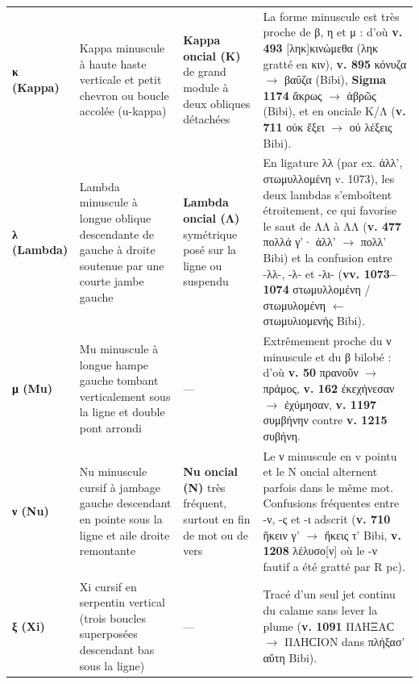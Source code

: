 \documentclass[11pt, a4paper, twoside]{article}
\renewcommand{\_}{\origunderscore\penalty0\relax}
\renewcommand{\texttt}[1]{#1}
\newcommand{\Rpc}{\textbf{R}\textsuperscript{pc}}
\newcommand{\Bibi}{\textit{Bibi}}
\newcommand{\SigmaSchol}{\textgreek{Σ}}
\newcommand{\inRas}[2]{[\kern-0.15em[#1]\kern-0.15em]#2}
\def\Rpc{R pc}%
\def\Bibi{Bibi}%
\def\SigmaSchol{Sigma}%
\def\inRas#1#2{[#1]#2}%
\begin{document}
{\begin{longtable}{@{}>{\raggedright\arraybackslash}p{} >{\raggedright\arraybackslash}p{} >{\raggedright\arraybackslash}p{} >{\raggedright\arraybackslash}p{}@{}}
\addlinespace[3pt]
\textbf{κ (Kappa)} & Kappa minuscule à haute haste verticale et petit chevron ou boucle accolée (\texttt{u}-kappa) & \textbf{Kappa oncial (\texttt{Κ})} de grand module à deux obliques détachées & La forme minuscule est très proche de β, η et μ : d'où \textbf{v. 493} \texttt{\inRas{ληκ}{κιν}ώμεθα} (\texttt{ληκ} gratté en \texttt{κιν}), \textbf{v. 895} \texttt{κόνυζα} $\to$ \texttt{βαΰζα} (\Bibi{}), \textbf{\SigmaSchol{} 1174} \texttt{ἄκρως} $\to$ \texttt{ἁβρῶς} (\Bibi{}), et en onciale \texttt{Κ/Λ} (\textbf{v. 711} \texttt{οὐκ ἔξει} $\to$ \texttt{οὐ λέξεις} \Bibi{}). \\
\addlinespace[3pt]
\textbf{λ (Lambda)} & Lambda minuscule à longue oblique descendante de gauche à droite soutenue par une courte jambe gauche & \textbf{Lambda oncial (\texttt{Λ})} symétrique posé sur la ligne ou suspendu & En ligature λλ (par ex. \texttt{ἀλλ'}, \texttt{στωμυλλομένη} v. 1073), les deux lambdas s'emboîtent étroitement, ce qui favorise le saut de \texttt{ΛΛ} à \texttt{ΛΛ} (\textbf{v. 477} \texttt{πολλά γ'· ἀλλ'} $\to$ \texttt{πολλ'} \Bibi{}) et la confusion entre -λλ-, -λ- et -λι- (\textbf{vv. 1073–1074} \texttt{στωμυλλομένη} / \texttt{στωμυλομένη} $\leftarrow$ \texttt{στωμυλιομενής} \Bibi{}). \\
\addlinespace[3pt]
\textbf{μ (Mu)} & Mu minuscule à longue hampe gauche tombant verticalement sous la ligne et double pont arrondi & — & Extrêmement proche du ν minuscule et du β bilobé : d'où \textbf{v. 50} \texttt{πρανοῦν} $\to$ \texttt{πράμος}, \textbf{v. 162} \texttt{ἐκεχήνεσαν} $\to$ \texttt{ἐχύμησαν}, \textbf{v. 1197} \texttt{συμβήνην} contre \textbf{v. 1215} \texttt{συβήνη}. \\
\addlinespace[3pt]
\textbf{ν (Nu)} & Nu minuscule cursif à jambage gauche descendant en pointe sous la ligne et aile droite remontante & \textbf{Nu oncial (\texttt{Ν})} très fréquent, surtout en fin de mot ou de vers & Le ν minuscule en \texttt{v} pointu et le \texttt{Ν} oncial alternent parfois dans le même mot. Confusions fréquentes entre -ν, -ς et -ι adscrit (\textbf{v. 710} \texttt{ἥκειν γ'} $\to$ \texttt{ἥκεις τ'} \Bibi{}, \textbf{v. 1208} \texttt{λέλυσο\inRas{ν}{}} où le -ν fautif a été gratté par \Rpc{}). \\
\addlinespace[3pt]
\textbf{ξ (Xi)} & Xi cursif en serpentin vertical (trois boucles superposées descendant bas sous la ligne) & — & Tracé d'un seul jet continu du calame sans lever la plume (\textbf{v. 1091} \texttt{ΠΛΗΞΑϹ} $\to$ \texttt{ΠΛΗϹΙΟΝ} dans \texttt{πλήξασ' αὕτη} \Bibi{}). \\

\end{longtable}}
\end{document}
